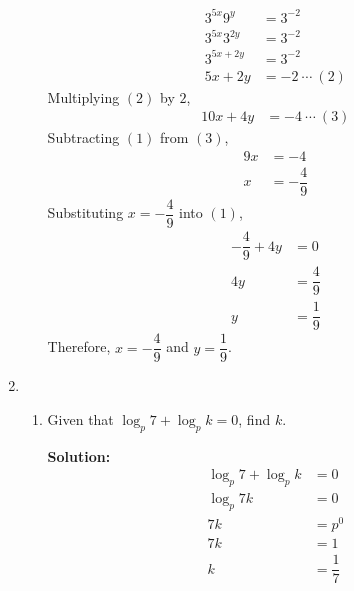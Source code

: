 \documentclass{report}
\newcommand{\sol}{\vspace{0.2cm}\textbf{Solution:}\vspace{0.2cm}}
\begin{document}
\begin{multicols*}{2}
\begin{enumerate}[leftmargin=*]
\begin{enumerate}
                        \begin{align*}
                            3^{5x} 9^y    & = 3^{-2}          \\
                            3^{5x} 3^{2y} & = 3^{-2}          \\
                            3^{5x+2y}     & = 3^{-2}          \\
                            5x + 2y       & = -2\ \cdots\ (2)
                        \end{align*}
                        Multiplying $(2)$ by $2$,
                        \begin{align*}
                            10x + 4y & = -4\ \cdots\ (3)
                        \end{align*}
                        Subtracting $(1)$ from $(3)$,
                        \begin{align*}
                            9x & = -4            \\
                            x  & = -\dfrac{4}{9}
                        \end{align*}
                        Substituting $x=-\dfrac{4}{9}$ into $(1)$,
                        \begin{align*}
                            -\dfrac{4}{9} + 4y & = 0            \\
                            4y                 & = \dfrac{4}{9} \\
                            y                  & = \dfrac{1}{9}
                        \end{align*}
                        Therefore, $x=-\dfrac{4}{9}$ and $y=\dfrac{1}{9}$.

              \end{enumerate}

        \item \begin{enumerate}
                  \item Given that $\log _{p} 7+\log _{p} k=0$, find $k$.

                        \sol{}
                        \begin{align*}
                            \log_p 7 + \log_p k & = 0            \\
                            \log_p 7k           & = 0            \\
                            7k                  & = p^0          \\
                            7k                  & = 1            \\
                            k                   & = \dfrac{1}{7}
                        \end{align*}


\end{enumerate}
\end{enumerate}
\end{multicols*}
\end{document}
